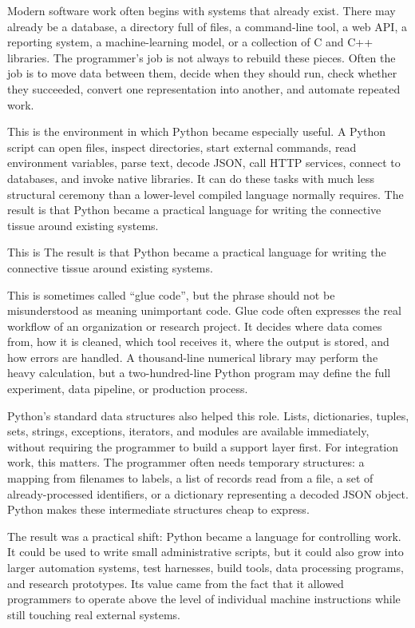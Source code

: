 Modern software work often begins with systems that already exist. There may already be a database, a directory full of files, a command-line tool, a web API, a reporting system, a machine-learning model, or a collection of C and C++ libraries. The programmer's job is not always to rebuild these pieces. Often the job is to move data between them, decide when they should run, check whether they succeeded, convert one representation into another, and automate repeated work.

This is the environment in which Python became especially useful. A Python script can open files, inspect directories, start external commands, read environment variables, parse text, decode JSON, call HTTP services, connect to databases, and invoke native libraries. It can do these tasks with much less structural ceremony than a lower-level compiled language normally requires. The result is that Python became a practical language for writing the connective tissue around existing systems.

This is The result is that Python became a practical language for writing the connective tissue around existing systems.

This is sometimes called ``glue code'', but the phrase should not be misunderstood as meaning unimportant code. Glue code often expresses the real workflow of an organization or research project. It decides where data comes from, how it is cleaned, which tool receives it, where the output is stored, and how errors are handled. A thousand-line numerical library may perform the heavy calculation, but a two-hundred-line Python program may define the full experiment, data pipeline, or production process.

Python's standard data structures also helped this role. Lists, dictionaries, tuples, sets, strings, exceptions, iterators, and modules are available immediately, without requiring the programmer to build a support layer first. For integration work, this matters. The programmer often needs temporary structures: a mapping from filenames to labels, a list of records read from a file, a set of already-processed identifiers, or a dictionary representing a decoded JSON object. Python makes these intermediate structures cheap to express.

The result was a practical shift: Python became a language for controlling work. It could be used to write small administrative scripts, but it could also grow into larger automation systems, test harnesses, build tools, data processing programs, and research prototypes. Its value came from the fact that it allowed programmers to operate above the level of individual machine instructions while still touching real external systems.

